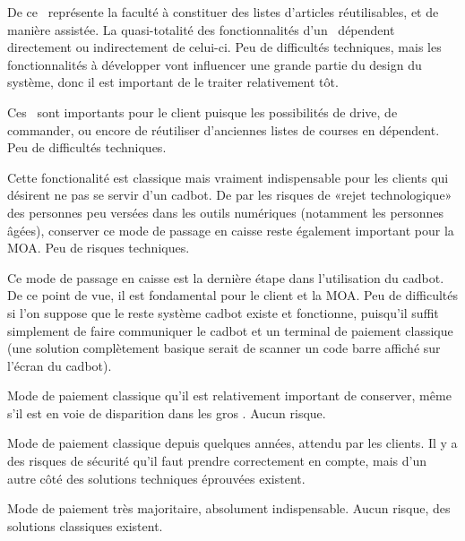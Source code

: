 \startnote
{} De ce \cu\ représente la faculté à constituer des listes d'articles réutilisables, et de manière assistée.
La quasi-totalité des fonctionnalités d'un \fm\ dépendent directement ou indirectement de celui-ci.
 Peu de difficultés techniques, mais les fonctionnalités à développer vont influencer une grande partie du design du système, donc il est important de le traiter relativement tôt.
\stopnote

\startnote
{} Ces \cu\ sont importants pour le client puisque les possibilités de drive, de commander, ou encore de réutiliser d'anciennes listes de courses en dépendent.
 Peu de difficultés techniques.
\stopnote

\startnote
{} Cette fonctionalité est classique mais vraiment indispensable pour les clients qui désirent ne pas se servir d'un cadbot.
De par les risques de «rejet technologique» des personnes peu versées dans les outils numériques (notamment les personnes âgées), conserver ce mode de passage en caisse reste également important pour la MOA.
 Peu de risques techniques.
\stopnote

\startnote
{} Ce mode de passage en caisse est la dernière étape dans l'utilisation du cadbot.
De ce point de vue, il est fondamental pour le client et la MOA.
 Peu de difficultés si l'on suppose que le reste système cadbot existe et fonctionne, puisqu'il suffit simplement de faire communiquer le cadbot et un terminal de paiement classique (une solution complètement basique serait de scanner un code barre affiché sur l'écran du cadbot).
\stopnote

\startnote
{} Mode de paiement classique qu'il est relativement important de conserver, même s'il est en voie de disparition dans les gros \fm.
 Aucun risque.
\stopnote

\startnote
{} Mode de paiement classique depuis quelques années, attendu par les clients.
 Il y a des risques de sécurité qu'il faut prendre correctement en compte, mais d'un autre côté des solutions techniques éprouvées existent.
\stopnote

\startnote
{} Mode de paiement très majoritaire, absolument indispensable.
 Aucun risque, des solutions classiques existent.
\stopnote

\TODO
\startnote
{}
\stopnote

